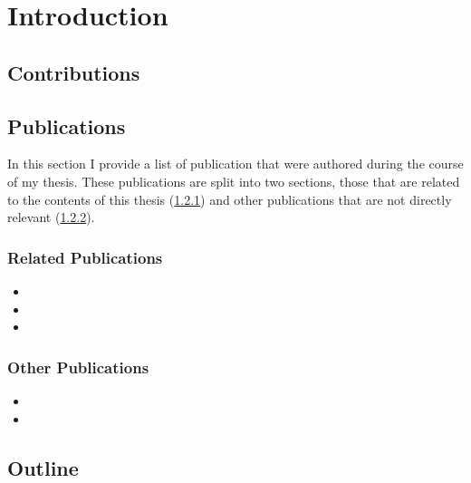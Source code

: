 \chapter{Introduction}\label{chap:intro}

\section{Contributions}\label{sec:intro_contrib}

\section{Publications}\label{sec:intro_pubs}
In this section I provide a list of publication that were authored during the
course of my thesis. These publications are split into two sections, those
that are related to the contents of this thesis 
(\cref{subsec:intro_rel_pubs}) and other publications that 
are not directly relevant (\cref{subsec:intro_other_pubs}).
\subsection{Related Publications}\label{subsec:intro_rel_pubs}
\begin{itemize}
	\item{}
	\item{}
	\item{}
\end{itemize}
\subsection{Other Publications}\label{subsec:intro_other_pubs}
\begin{itemize}
	\item{}
	\item{}
\end{itemize}
\section{Outline}\label{sec:introduction_outline}

